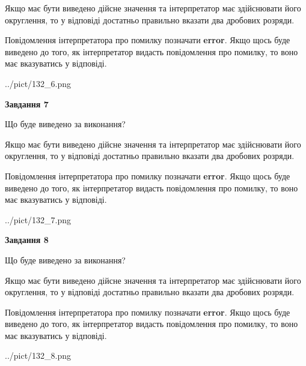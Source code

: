 \documentclass[12pt, ukrainian]{article}
\begin{document}
{\begin {Large}
Якщо має бути виведено дійсне значення та інтерпретатор має здійснювати його округлення, 
то у відповіді достатньо правильно вказати два дробових розряди.

Повідомлення інтерпретатора про помилку позначати \textbf{error}.
Якщо щось буде виведено до того, як інтерпретатор видасть повідомлення про помилку, 
то воно має вказуватись у відповіді. \par

\begin{center}
	{../pict/132_6.png}
\end{center}
\newpage

{\begin {center}\textbf{Завдання 7}\end {center}}\par
Що буде виведено за виконання? \par

Якщо має бути виведено дійсне значення та інтерпретатор має здійснювати його округлення, 
то у відповіді достатньо правильно вказати два дробових розряди.

Повідомлення інтерпретатора про помилку позначати \textbf{error}.
Якщо щось буде виведено до того, як інтерпретатор видасть повідомлення про помилку, 
то воно має вказуватись у відповіді. \par

\begin{center}
	{../pict/132_7.png}
\end{center}
\newpage

{\begin {center}\textbf{Завдання 8}\end {center}}\par
Що буде виведено за виконання? \par

Якщо має бути виведено дійсне значення та інтерпретатор має здійснювати його округлення, 
то у відповіді достатньо правильно вказати два дробових розряди.

Повідомлення інтерпретатора про помилку позначати \textbf{error}.
Якщо щось буде виведено до того, як інтерпретатор видасть повідомлення про помилку, 
то воно має вказуватись у відповіді. \par

\begin{center}
	{../pict/132_8.png}
\end{center}
\newpage


\end{Large}}
\end{document}

